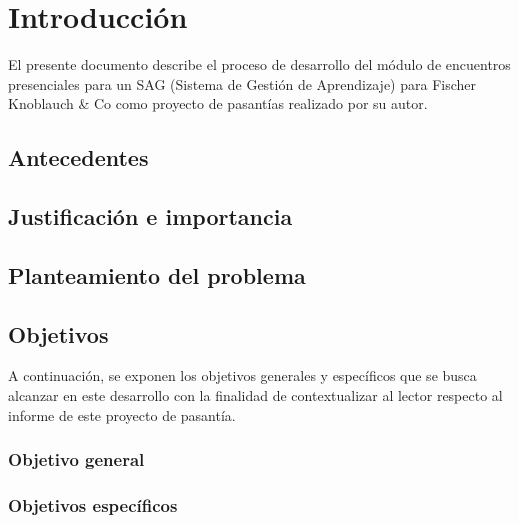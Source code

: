 \chapter*{Introducción}
\thispagestyle{empty} %
 
El presente documento describe el proceso de desarrollo del módulo de encuentros presenciales para un SAG (Sistema de Gestión de Aprendizaje) para Fischer Knoblauch \& Co como proyecto de pasantías realizado por su autor.

\section*{Antecedentes}


\section*{Justificación e importancia}


\section*{Planteamiento del problema}


\section*{Objetivos}
A continuación, se exponen los objetivos generales y específicos que se busca alcanzar en este desarrollo con la finalidad de contextualizar al lector respecto al informe de este proyecto de pasantía.

\subsection*{Objetivo general}


\subsection*{Objetivos específicos}





